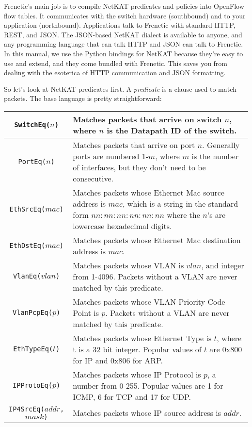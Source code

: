 Frenetic's main job is to compile NetKAT predicates and policies into OpenFlow flow tables.  
It communicates with the switch hardware (southbound) and to your application (northbound).
Applications talk to Frenetic with standard HTTP, REST, and JSON.
The JSON-based NetKAT dialect is available to anyone, and any programming language that can talk HTTP and 
JSON can talk to Frenetic.
In this manual, we use the Python bindings for NetKAT because they're easy to use and extend, and they
come bundled with Frenetic.  
This saves you from dealing with the esoterica of HTTP communication and JSON formatting.  

So let's look at NetKAT predicates first.  
A \textit{predicate} is a clause used to match packets.
The base language is pretty straightforward:

\bigskip
\begin{tabularx}{\linewidth}{|c|X|}
\hline\hline
\texttt{SwitchEq($n$)} & Matches packets that arrive on switch $n$, where $n$ is the Datapath ID of the switch.  
\\ \hline
\texttt{PortEq($n$)} & Matches packets that arrive on port $n$.  Generally ports are numbered 1-$m$, where $m$ is the
number of interfaces, but they don't need to be consecutive.  
\\ \hline
\texttt{EthSrcEq($mac$)} & Matches packets whose Ethernet Mac source address is $mac$, which is a string in the standard form $nn:nn:nn:nn:nn:nn$ where the $n$'s are lowercase hexadecimal digits.
\\ \hline
\texttt{EthDstEq($mac$)} & Matches packets whose Ethernet Mac destination address is $mac$.
\\ \hline
\texttt{VlanEq($vlan$)} & Matches packets whose VLAN is $vlan$, and integer from 1-4096.  Packets without a VLAN are never matched by this predicate.
\\ \hline
\texttt{VlanPcpEq($p$)} & Matches packets whose VLAN Priority Code Point is $p$.  Packets without a VLAN are never matched by this predicate.
\\ \hline
\texttt{EthTypeEq($t$)} & Matches packets whose Ethernet Type is $t$, where t is a 32 bit integer.  Popular values of $t$ are 0x800 for IP and 0x806 for ARP.  
\\ \hline
\texttt{IPProtoEq($p$)} & Matches packets whose IP Protocol is $p$, a number from 0-255.  
Popular values are 1 for ICMP, 6 for TCP and 17 for UDP.  
\\ \hline
\texttt{IP4SrcEq($addr$, $mask$)} & Matches packets whose IP source address is $addr$.  

\end{tabularx}
